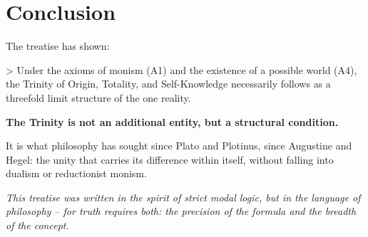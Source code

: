 \documentclass[
]{article}
\begin{document}
\section{Conclusion}\label{conclusion}

The treatise has shown:

> Under the axioms of monism (A1) and the existence of a possible world (A4), the Trinity of Origin, Totality, and Self-Knowledge necessarily follows as a threefold limit structure of the one reality.

\textbf{The Trinity is not an additional entity, but a structural condition.}

It is what philosophy has sought since Plato and Plotinus, since Augustine and Hegel: the unity that carries its difference within itself, without falling into dualism or reductionist monism.

\begin{center}
\emph{This treatise was written in the spirit of strict modal logic, but in the language of philosophy – for truth requires both: the precision of the formula and the breadth of the concept.}
\end{center}
\end{document}
